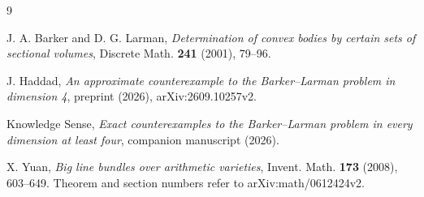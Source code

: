 \documentclass[11pt]{amsart}
\numberwithin{equation}{section}
\theoremstyle{definition}
\theoremstyle{remark}
\begin{document}
\begin{thebibliography}{9}

 J. A. Barker and D. G. Larman, \emph{Determination of convex bodies by certain sets of sectional volumes}, Discrete Math. \textbf{241} (2001), 79--96.

 J. Haddad, \emph{An approximate counterexample to the Barker--Larman problem in dimension 4}, preprint (2026), arXiv:2609.10257v2.

 Knowledge Sense, \emph{Exact counterexamples to the Barker--Larman problem in every dimension at least four}, companion manuscript (2026).

 X. Yuan, \emph{Big line bundles over arithmetic varieties}, Invent. Math. \textbf{173} (2008), 603--649. Theorem and section numbers refer to arXiv:math/0612424v2.

\end{thebibliography}
\end{document}
